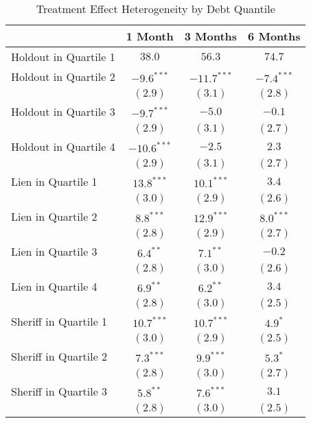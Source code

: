\begin{table}[htb]
\caption{Treatment Effect Heterogeneity by Debt Quantile}
\begin{center}
\begin{tabular}{l c c c }
\hline
 & 1 Month & 3 Months & 6 Months \\
\hline
Holdout in Quartile 1 & $38.0$  & $56.3$  & $74.7$ \\
\hline
Holdout in Quartile 2 & $-9.6^{***}$  & $-11.7^{***}$ & $-7.4^{***}$ \\
                      & $(2.9)$       & $(3.1)$       & $(2.8)$      \\
Holdout in Quartile 3 & $-9.7^{***}$  & $-5.0$        & $-0.1$       \\
                      & $(2.9)$       & $(3.1)$       & $(2.7)$      \\
Holdout in Quartile 4 & $-10.6^{***}$ & $-2.5$        & $2.3$        \\
                      & $(2.9)$       & $(3.1)$       & $(2.7)$      \\
Lien in Quartile 1    & $13.8^{***}$  & $10.1^{***}$  & $3.4$        \\
                      & $(3.0)$       & $(2.9)$       & $(2.6)$      \\
Lien in Quartile 2    & $8.8^{***}$   & $12.9^{***}$  & $8.0^{***}$  \\
                      & $(2.8)$       & $(2.9)$       & $(2.7)$      \\
Lien in Quartile 3    & $6.4^{**}$    & $7.1^{**}$    & $-0.2$       \\
                      & $(2.8)$       & $(3.0)$       & $(2.6)$      \\
Lien in Quartile 4    & $6.9^{**}$    & $6.2^{**}$    & $3.4$        \\
                      & $(2.8)$       & $(3.0)$       & $(2.5)$      \\
Sheriff in Quartile 1 & $10.7^{***}$  & $10.7^{***}$  & $4.9^{*}$    \\
                      & $(3.0)$       & $(2.9)$       & $(2.5)$      \\
Sheriff in Quartile 2 & $7.3^{***}$   & $9.9^{***}$   & $5.3^{*}$    \\
                      & $(2.8)$       & $(3.0)$       & $(2.7)$      \\
Sheriff in Quartile 3 & $5.8^{**}$    & $7.6^{***}$   & $3.1$        \\
                      & $(2.8)$       & $(3.0)$       & $(2.5)$      \\

\end{tabular}
\end{center}
\end{table}

